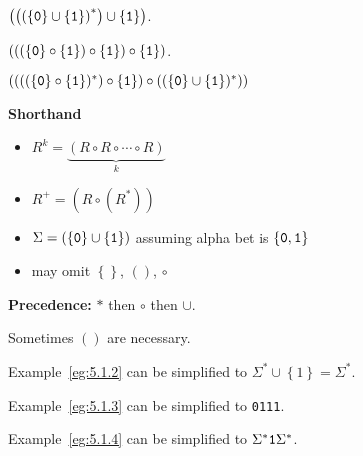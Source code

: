 \documentclass{notes}
\begin{document}
\begin{eg}
  $\left ( \left ( \left ( \left \{ \verb~0~ \right \} \cup \left \{ \verb~1~ \right \} \right )^* \right ) \cup \left \{ \verb~1~ \right \} \right )$.
\end{eg}

\begin{eg}
  $\left ( \left ( \left ( \left \{ \verb~0~ \right \} \circ \left \{ \verb~1~ \right \} \right ) \circ \left \{ \verb~1~ \right \} \right ) \circ \left \{ \verb~1~ \right \} \right )$.
\end{eg}

\begin{eg}
  $((((\left \{ \verb~0~ \right \} \circ \left \{ \verb~1~ \right \})^*) \circ \left \{ \verb~1~ \right \}) \circ ((\left \{ \verb~0~ \right \} \cup \left \{ \verb~1~ \right \})^*))$
\end{eg}

{\boldmath \bfseries Shorthand}

\begin{itemize}
  \item $R^k = \underbrace{(R \circ R \circ \cdots \circ R)}_{k}$
    
  \item $R^+ = (R \circ (R^*))$
    
  \item $\Sigma = (\left \{ \verb~0~ \right \} \cup \left \{ \verb~1~ \right \})$ assuming alpha bet is $\left \{ \verb~0~, \verb~1~ \right \}$
    
  \item may omit $\left \{ \right \}$, $()$, $\circ$
\end{itemize}

{\boldmath \bfseries Precedence:} $*$ then $\circ$ then $\cup$.

\begin{note}
  Sometimes $()$ are necessary.
\end{note}

\begin{eg}
  Example~\ref{eg:5.1.2} can be simplified to $\Sigma^* \cup \left \{ 1 \right \} = \Sigma^*$.
\end{eg}

\begin{eg}
  Example~\ref{eg:5.1.3} can be simplified to \verb~0111~.
\end{eg}

\begin{eg}
  Example~\ref{eg:5.1.4} can be simplified to $\Sigma^* \verb~1~ \Sigma^*$.
\end{eg}
\end{document}

